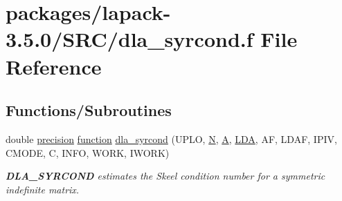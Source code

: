 \hypertarget{dla__syrcond_8f}{}\section{packages/lapack-\/3.5.0/\+S\+R\+C/dla\+\_\+syrcond.f File Reference}
\label{dla__syrcond_8f}
\subsection*{Functions/\+Subroutines}
\begin{DoxyCompactItemize}
\item 
double \hyperlink{numinquire_8h_a2c8e616467665d0b2814d4c1589ba74e}{precision} \hyperlink{afunc_8m_a7b5e596df91eadea6c537c0825e894a7}{function} \hyperlink{group__doubleSYcomputational_ga9e31c57f738555732d4234ee0e47487e}{dla\+\_\+syrcond} (U\+P\+L\+O, \hyperlink{polmisc_8c_a0240ac851181b84ac374872dc5434ee4}{N}, \hyperlink{classA}{A}, \hyperlink{example__user_8c_ae946da542ce0db94dced19b2ecefd1aa}{L\+D\+A}, A\+F, L\+D\+A\+F, I\+P\+I\+V, C\+M\+O\+D\+E, C, I\+N\+F\+O, W\+O\+R\+K, I\+W\+O\+R\+K)
\begin{DoxyCompactList}\small\item\em {\bfseries D\+L\+A\+\_\+\+S\+Y\+R\+C\+O\+N\+D} estimates the Skeel condition number for a symmetric indefinite matrix. \end{DoxyCompactList}\end{DoxyCompactItemize}
